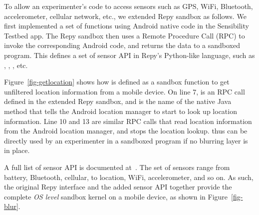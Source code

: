 To allow an experimenter's code to access sensors such as 
GPS, WiFi, Bluetooth, accelerometer, cellular network, etc., we  
extended Repy sandbox as follows. We first implemented a set of functions using
Android native code in the Sensibility Testbed app. The Repy 
sandbox then uses a Remote Procedure Call (RPC) to invoke the
corresponding Android code, and returns the data 
to a sandboxed program. This defines a set of sensor API in 
Repy's Python-like language, such as , 
, , etc. 

Figure~\ref{fig-getlocation} shows how  
is defined as a sandbox function to get unfiltered location 
information from a mobile device. 
On line 7,  is an RPC call 
defined in the extended Repy sandbox, 
and  is the name of the native Java method that tells the Android 
location manager to start to look up location information. Line 10 and 13 are similar RPC 
calls that read location information from the Android location manager, and stops the location 
lookup.  thus %
can be directly used by an experimenter in a sandboxed program if no blurring layer is in place.

A full list of sensor API is documented at~\cite{sensor-api}. The set
of sensors range from battery, Bluetooth, cellular, to location, WiFi, 
accelerometer, and so on. 
As such, the original Repy interface and the added sensor API together 
provide the complete \textit{OS level} sandbox kernel on a mobile 
device, as shown in Figure~\ref{fig-blur}.

